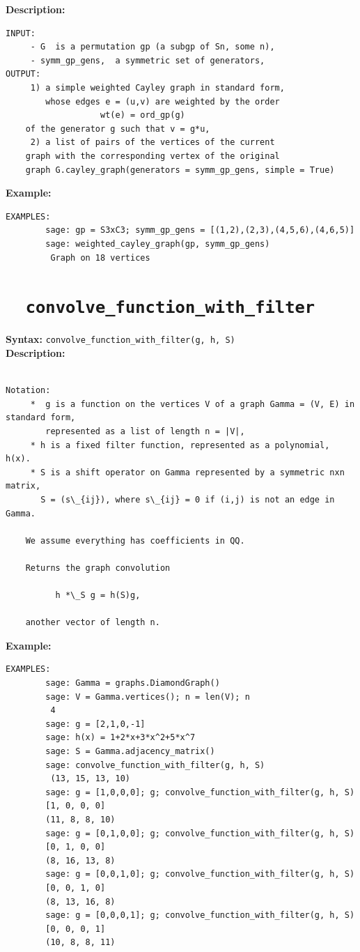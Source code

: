 \documentclass{article}
\begin{document}
\textbf{Description:}
\begin{verbatim}
INPUT:
     - G  is a permutation gp (a subgp of Sn, some n),
     - symm_gp_gens,  a symmetric set of generators, 
OUTPUT:
     1) a simple weighted Cayley graph in standard form,
        whose edges e = (u,v) are weighted by the order 
                   wt(e) = ord_gp(g)
	of the generator g such that v = g*u, 
     2) a list of pairs of the vertices of the current
	graph with the corresponding vertex of the original
	graph G.cayley_graph(generators = symm_gp_gens, simple = True)
\end{verbatim}

\textbf{Example:}
\begin{verbatim}
EXAMPLES:
        sage: gp = S3xC3; symm_gp_gens = [(1,2),(2,3),(4,5,6),(4,6,5)]
        sage: weighted_cayley_graph(gp, symm_gp_gens)
         Graph on 18 vertices
\end{verbatim}

\section{\tt \ \ convolve\_function\_with\_filter}

\textbf{Syntax:} \verb}convolve_function_with_filter(g, h, S)}\\

\textbf{Description:}
\begin{verbatim}

Notation:
     *  g is a function on the vertices V of a graph Gamma = (V, E) in standard form,
        represented as a list of length n = |V|,
     * h is a fixed filter function, represented as a polynomial, h(x).
     * S is a shift operator on Gamma represented by a symmetric nxn matrix, 
       S = (s\_{ij}), where s\_{ij} = 0 if (i,j) is not an edge in Gamma.
 
    We assume everything has coefficients in QQ.

    Returns the graph convolution

          h *\_S g = h(S)g,

    another vector of length n.
\end{verbatim}

\textbf{Example:}
\begin{verbatim}
EXAMPLES:
        sage: Gamma = graphs.DiamondGraph()
        sage: V = Gamma.vertices(); n = len(V); n
         4
        sage: g = [2,1,0,-1]
        sage: h(x) = 1+2*x+3*x^2+5*x^7
        sage: S = Gamma.adjacency_matrix()
        sage: convolve_function_with_filter(g, h, S)
         (13, 15, 13, 10)
        sage: g = [1,0,0,0]; g; convolve_function_with_filter(g, h, S)
        [1, 0, 0, 0]
        (11, 8, 8, 10)
        sage: g = [0,1,0,0]; g; convolve_function_with_filter(g, h, S)
        [0, 1, 0, 0]
        (8, 16, 13, 8)
        sage: g = [0,0,1,0]; g; convolve_function_with_filter(g, h, S)
        [0, 0, 1, 0]
        (8, 13, 16, 8)
        sage: g = [0,0,0,1]; g; convolve_function_with_filter(g, h, S)
        [0, 0, 0, 1]
        (10, 8, 8, 11)
\end{verbatim}
\end{document}
